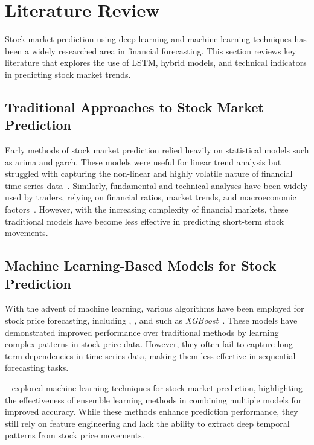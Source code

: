 \clearpage
\section{Literature Review}

Stock market prediction using deep learning and machine learning techniques has been 
a widely researched area in financial forecasting. This section reviews key 
literature that explores the use of LSTM, hybrid models, and technical indicators 
in predicting stock market trends.

\subsection{Traditional Approaches to Stock Market Prediction}

Early methods of stock market prediction relied heavily on statistical models such as 
\acrfull{arima} and \acrfull{garch}. These models were useful for linear trend
analysis but struggled with capturing the non-linear and highly volatile nature of
financial time-series data~\parencite{guo2024LSTMStock}. Similarly, fundamental and
technical analyses have been widely used by traders, relying on financial ratios, 
market trends, and macroeconomic 
factors~\parencite{balasubramanian2023SystematicSurvey}. However, with the increasing
complexity of financial markets, these traditional models have become less effective
in predicting short-term stock movements.

\subsection{Machine Learning-Based Models for Stock Prediction}

With the advent of machine learning, various algorithms have been employed for stock price
forecasting, including , , and  such as 
\emph{XGBoost}~\parencite{nabipour2020DeepLearning}. These models have demonstrated 
improved performance over 
traditional methods by learning complex patterns in stock price data. However, they often 
fail to capture long-term dependencies in time-series data, making them less effective in 
sequential forecasting tasks.

~\parencite{parmar2018stock} explored machine learning 
techniques for stock market 
prediction, highlighting the effectiveness of ensemble learning methods in combining 
multiple models for improved accuracy. While these methods enhance prediction performance,
they still rely on feature engineering and lack the ability to extract deep temporal 
patterns from stock price movements.

